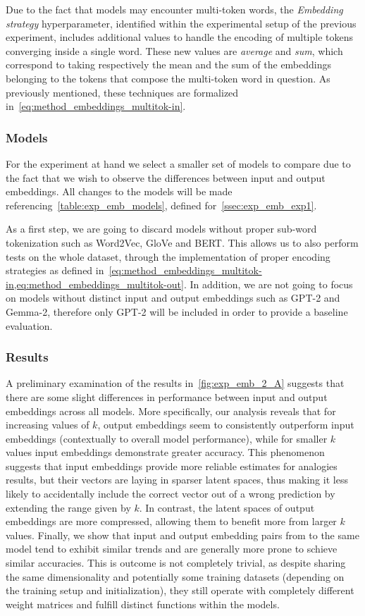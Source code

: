 Due to the fact that models may encounter multi-token words, the \emph{Embedding strategy} hyperparameter, identified within the experimental setup of the previous experiment, includes additional values to handle the encoding of multiple tokens converging inside a single word.
These new values are \emph{average} and \emph{sum}, which correspond to taking respectively the mean and the sum of the embeddings belonging to the tokens that compose the multi-token word in question.
As previously mentioned, these techniques are formalized in~\cref{eq:method_embeddings_multitok-in}.

\subsubsection{Models}\label{sssec:exp_emb_exp2_models}

For the experiment at hand we select a smaller set of models to compare due to the fact that we wish to observe the differences between input and output embeddings.
All changes to the models will be made referencing~\cref{table:exp_emb_models}, defined for~\cref{ssec:exp_emb_exp1}.

As a first step, we are going to discard models without proper sub-word tokenization such as Word2Vec, GloVe and BERT\@.
This allows us to also perform tests on the whole dataset, through the implementation of proper encoding strategies as defined in~\cref{eq:method_embeddings_multitok-in,eq:method_embeddings_multitok-out}.
In addition, we are not going to focus on models without distinct input and output embeddings such as GPT-2 and Gemma-2, therefore only GPT-2 will be included in order to provide a baseline evaluation.

\subsubsection{Results}

A preliminary examination of the results in~\cref{fig:exp_emb_2_A} suggests that there are some slight differences in performance between input and output embeddings across all models.
More specifically, our analysis reveals that for increasing values of $k$, output embeddings seem to consistently outperform input embeddings (contextually to overall model performance), while for smaller $k$ values input embeddings demonstrate greater accuracy.
This phenomenon suggests that input embeddings provide more reliable estimates for analogies results, but their vectors are laying in sparser latent spaces, thus making it less likely to accidentally include the correct vector out of a wrong prediction by extending the range given by $k$.
In contrast, the latent spaces of output embeddings are more compressed, allowing them to benefit more from larger $k$ values.
Finally, we show that input and output embedding pairs from to the same model tend to exhibit similar trends and are generally more prone to schieve similar accuracies.
This is outcome is not completely trivial, as despite sharing the same dimensionality and potentially some training datasets (depending on the training setup and initialization), they still operate with completely different weight matrices and fulfill distinct functions within the models.

